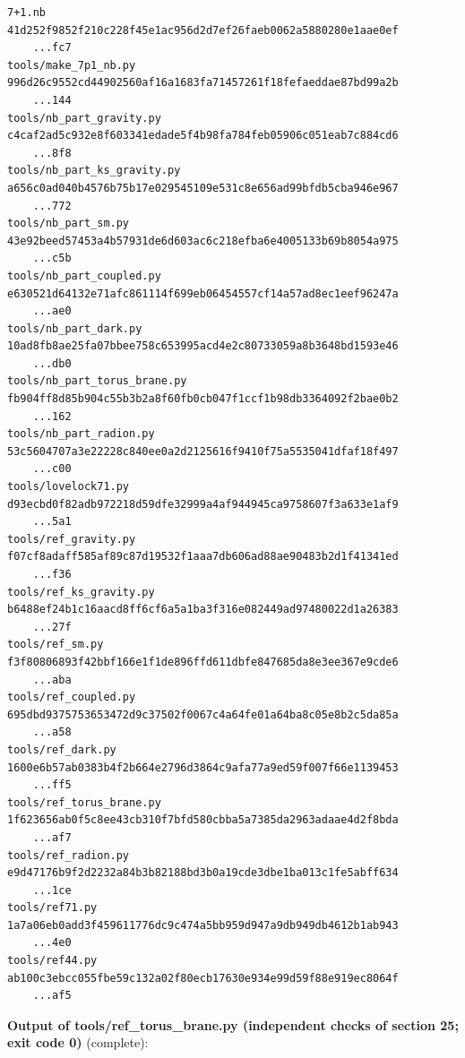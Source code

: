 \documentclass[10pt,a4paper]{article}
\begin{document}
\begin{Verbatim}[fontsize=\small,frame=single,framesep=2mm]
7+1.nb                             41d252f9852f210c228f45e1ac956d2d7ef26faeb0062a5880280e1aae0ef
    ...fc7
tools/make_7p1_nb.py               996d26c9552cd44902560af16a1683fa71457261f18fefaeddae87bd99a2b
    ...144
tools/nb_part_gravity.py           c4caf2ad5c932e8f603341edade5f4b98fa784feb05906c051eab7c884cd6
    ...8f8
tools/nb_part_ks_gravity.py        a656c0ad040b4576b75b17e029545109e531c8e656ad99bfdb5cba946e967
    ...772
tools/nb_part_sm.py                43e92beed57453a4b57931de6d603ac6c218efba6e4005133b69b8054a975
    ...c5b
tools/nb_part_coupled.py           e630521d64132e71afc861114f699eb06454557cf14a57ad8ec1eef96247a
    ...ae0
tools/nb_part_dark.py              10ad8fb8ae25fa07bbee758c653995acd4e2c80733059a8b3648bd1593e46
    ...db0
tools/nb_part_torus_brane.py       fb904ff8d85b904c55b3b2a8f60fb0cb047f1ccf1b98db3364092f2bae0b2
    ...162
tools/nb_part_radion.py            53c5604707a3e22228c840ee0a2d2125616f9410f75a5535041dfaf18f497
    ...c00
tools/lovelock71.py                d93ecbd0f82adb972218d59dfe32999a4af944945ca9758607f3a633e1af9
    ...5a1
tools/ref_gravity.py               f07cf8adaff585af89c87d19532f1aaa7db606ad88ae90483b2d1f41341ed
    ...f36
tools/ref_ks_gravity.py            b6488ef24b1c16aacd8ff6cf6a5a1ba3f316e082449ad97480022d1a26383
    ...27f
tools/ref_sm.py                    f3f80806893f42bbf166e1f1de896ffd611dbfe847685da8e3ee367e9cde6
    ...aba
tools/ref_coupled.py               695dbd9375753653472d9c37502f0067c4a64fe01a64ba8c05e8b2c5da85a
    ...a58
tools/ref_dark.py                  1600e6b57ab0383b4f2b664e2796d3864c9afa77a9ed59f007f66e1139453
    ...ff5
tools/ref_torus_brane.py           1f623656ab0f5c8ee43cb310f7bfd580cbba5a7385da2963adaae4d2f8bda
    ...af7
tools/ref_radion.py                e9d47176b9f2d2232a84b3b82188bd3b0a19cde3dbe1ba013c1fe5abff634
    ...1ce
tools/ref71.py                     1a7a06eb0add3f459611776dc9c474a5bb959d947a9db949db4612b1ab943
    ...4e0
tools/ref44.py                     ab100c3ebcc055fbe59c132a02f80ecb17630e934e99d59f88e919ec8064f
    ...af5
\end{Verbatim}
\textbf{Output of tools/ref\_torus\_brane.py (independent checks of section 25; exit code 0)} (complete):
\end{document}
